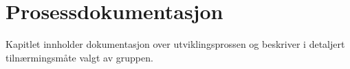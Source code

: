 \chapter{Prosessdokumentasjon}
Kapitlet innholder dokumentasjon over utviklingsprossen og beskriver i detaljert tilnærmingsmåte valgt av gruppen.







